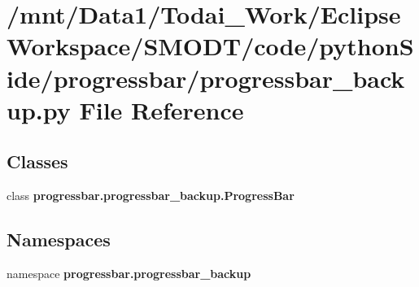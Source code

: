 \section{/mnt/\-Data1/\-Todai\-\_\-\-Work/\-Eclipse\-Workspace/\-S\-M\-O\-D\-T/code/python\-Side/progressbar/progressbar\-\_\-backup.py File Reference}
\label{progressbar__backup_8py}
\subsection*{Classes}
\begin{DoxyCompactItemize}
\item 
class {\bf progressbar.\-progressbar\-\_\-backup.\-Progress\-Bar}
\end{DoxyCompactItemize}
\subsection*{Namespaces}
\begin{DoxyCompactItemize}
\item 
namespace {\bf progressbar.\-progressbar\-\_\-backup}
\end{DoxyCompactItemize}
